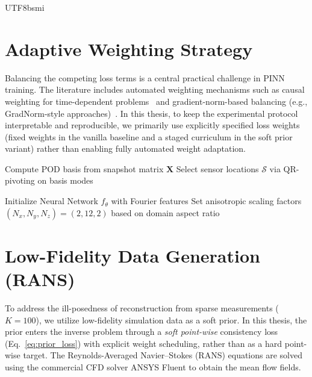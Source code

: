 \documentclass[master]{NTHUthesis}
\begin{document}
\begin{CJK*}{UTF8}{bsmi}
\section{Adaptive Weighting Strategy}
\label{sec:adaptive_weighting}
Balancing the competing loss terms is a central practical challenge in PINN training. The literature includes automated weighting mechanisms such as causal weighting for time-dependent problems~\cite{WANG2024116813} and gradient-norm-based balancing (e.g., GradNorm-style approaches)~\cite{Ko2025JCP, 10.1063/5.0180770}. In this thesis, to keep the experimental protocol interpretable and reproducible, we primarily use explicitly specified loss weights (fixed weights in the vanilla baseline and a staged curriculum in the soft prior variant) rather than enabling fully automated weight adaptation.

\begin{algorithm}[t]
  \SetAlgoLined
  \caption{Proposed Framework: Sparse Turbulence Reconstruction}
  \label{alg:reconstruction}
  

  Compute POD basis from snapshot matrix $\mathbf{X}$\;
  Select sensor locations $\mathcal{S}$ via QR-pivoting on basis modes\;

  Initialize Neural Network $f_\theta$ with Fourier features\;
  Set anisotropic scaling factors $(N_x, N_y, N_z) = (2, 12, 2)$ based on domain aspect ratio\;
  
\end{algorithm}

\section{Low-Fidelity Data Generation (RANS)}
\label{sec:rans_setup}
To address the ill-posedness of reconstruction from sparse measurements ($K=100$), we utilize low-fidelity simulation data as a soft prior. In this thesis, the prior enters the inverse problem through a \emph{soft point-wise} consistency loss (Eq.~\eqref{eq:prior_loss}) with explicit weight scheduling, rather than as a hard point-wise target.
The Reynolds-Averaged Navier--Stokes (RANS) equations are solved using the commercial CFD solver ANSYS Fluent to obtain the mean flow fields.


\end{CJK*}
\end{document}
